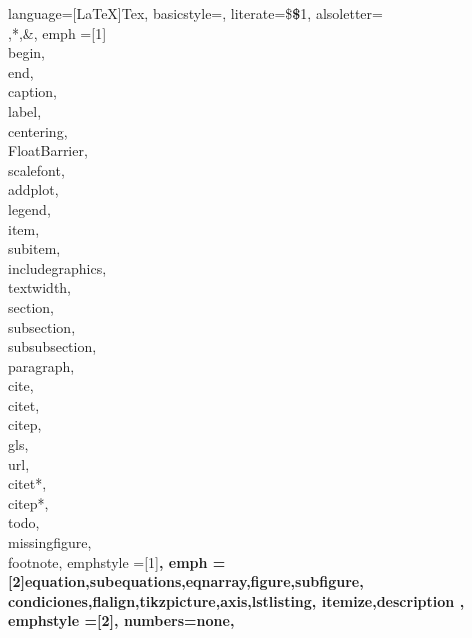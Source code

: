 	{
	language=[LaTeX]{Tex},
    basicstyle=\scriptsize,
    literate={\$}{{{\bfseries\$}}}1,
    alsoletter={\\,*,\&},
    emph =[1]{\\begin,\\end,\\caption,\\label,\\centering,\\FloatBarrier,
              \,\\scalefont,\\addplot,\,
              \\legend,\\item,\\subitem,\\includegraphics,\\textwidth,
              \\section,\\subsection,\\subsubsection,\\paragraph,
              \\cite,\\citet,\\citep,\\gls,\,\\url,
              \\citet*,\\citep*,\\todo,\\missingfigure,\\footnote},
  	emphstyle =[1]\bfseries,
  	emph = [2]{equation,subequations,eqnarray,figure,subfigure,
  			   condiciones,flalign,tikzpicture,axis,lstlisting,
  			   itemize,description
  			   },
  	emphstyle =[2]\bfseries,
    numbers=none,
	}
	
